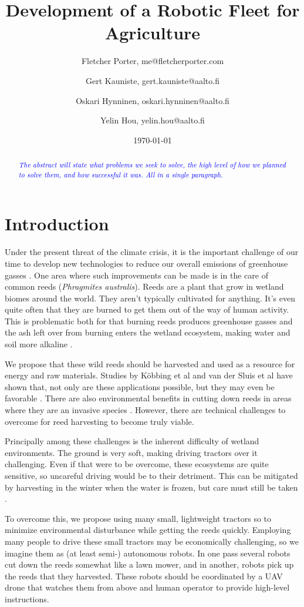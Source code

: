 \documentclass[12pt,american,german,british]{article}
\title{Development of a Robotic Fleet for Agriculture }
\date{\today}
\author{
	Fletcher Porter, me@fletcherporter.com
	\and Gert Kauniste, gert.kauniste@aalto.fi
	\and Oskari Hynninen, oskari.hynninen@aalto.fi
	\and Yelin Hou, yelin.hou@aalto.fi
}
\newcommand{\reedtemp}[1] {
	\textit{\textcolor{blue}{#1}}
}
\begin{document}
\raggedright

\maketitle

\begin{abstract}
\reedtemp{
The abstract will state what problems we seek to solve, the high level of how
we planned to solve them, and how successful it was.  All in a single
paragraph.
}
\end{abstract}

\section{Introduction}

Under the present threat of the climate crisis, it is the important challenge
of our time to develop new technologies to reduce our overall emissions of
greenhouse gasses \cite{IPCC2022}.  One area where such improvements can be
made is in the care of common reeds ({\it Phragmites australis}).  Reeds are a
plant that grow in wetland biomes around the world.  They aren't typically
cultivated for anything.  It's even quite often that they are burned to get
them out of the way of human activity.  This is problematic both for that
burning reeds produces greenhouse gasses and the ash left over from burning
enters the wetland ecosystem, making water and soil more alkaline
\cite{Sluis2013}.

We propose that these wild reeds should be harvested and used as a resource for
energy and raw materials.  Studies by Köbbing et al and van der Sluis et al
have shown that, not only are these applications possible, but they may even be
favorable \cite{Sluis2013}\cite{Koebbing12013}.  There are also environmental
benefits in cutting down reeds in areas where they are an invasive species
\cite{Tulbure2007}.  However, there are technical challenges to overcome for
reed harvesting to become truly viable.

Principally among these challenges is the inherent difficulty of wetland
environments.  The ground is very soft, making driving tractors over it
challenging.  Even if that were to be overcome, these ecosystems are quite
sensitive, so uncareful driving would be to their detriment.  This can be
mitigated by harvesting in the winter when the water is frozen, but care must
still be taken \cite{Sluis2013}.

To overcome this, we propose using many small, lightweight tractors so to
minimize environmental disturbance while getting the reeds quickly.  Employing
many people to drive these small tractors may be economically challenging, so
we imagine them as (at least semi-) autonomous robots.  In one pass several
robots cut down the reeds somewhat like a lawn mower, and in another, robots
pick up the reeds that they harvested.  These robots should be coordinated by a
UAV drone that watches them from above and human operator to provide
high-level instructions.
\end{document}
